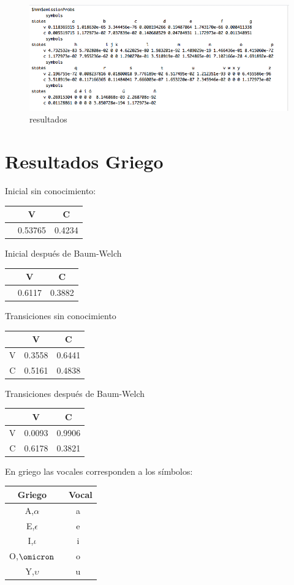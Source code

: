 \documentclass[]{article}
\begin{document}
\begin{figure}[htbp]
\centering
\includegraphics{salida_vocales.png}
\caption{resultados}
\end{figure}

\section{Resultados Griego}\label{resultados-griego}

Inicial sin conocimiento:

\begin{longtable}[c]{@{}ccc@{}}
\toprule
& V & C\tabularnewline
\midrule
\endhead
& 0.53765 & 0.4234\tabularnewline
\bottomrule
\end{longtable}

Inicial después de Baum-Welch

\begin{longtable}[c]{@{}ccc@{}}
\toprule
& V & C\tabularnewline
\midrule
\endhead
& 0.6117 & 0.3882\tabularnewline
\bottomrule
\end{longtable}

Transiciones sin conocimiento

\begin{longtable}[c]{@{}ccc@{}}
\toprule
& V & C\tabularnewline
\midrule
\endhead
V & 0.3558 & 0.6441\tabularnewline
C & 0.5161 & 0.4838\tabularnewline
\bottomrule
\end{longtable}

Transiciones después de Baum-Welch

\begin{longtable}[c]{@{}ccc@{}}
\toprule
& V & C\tabularnewline
\midrule
\endhead
V & 0.0093 & 0.9906\tabularnewline
C & 0.6178 & 0.3821\tabularnewline
\bottomrule
\end{longtable}

En griego las vocales corresponden a los símbolos:

\begin{longtable}[c]{@{}cc@{}}
\toprule
Griego & ~Vocal\tabularnewline
\midrule
\endhead
A,\(\alpha\) & a\tabularnewline
E,\(\epsilon\) & e\tabularnewline
I,\(\iota\) & i\tabularnewline
O,\(\omicron\) & o\tabularnewline
Y,\(\upsilon\) & u\tabularnewline
\bottomrule
\end{longtable}
\end{document}
